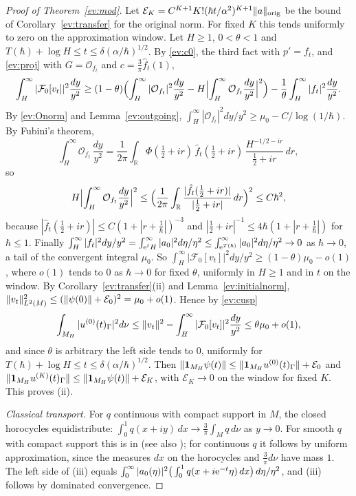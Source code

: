 \begin{proof}[Proof of Theorem~\ref{ev:mod}]
Let $\mathcal E_K=C^{K+1}K!(\hbar t/\alpha^2)^{K+1}\lVert a\rVert_{\mathrm{orig}}$ be the bound of Corollary~\ref{ev:transfer} for the original norm. For fixed $K$ this tends uniformly to zero on the approximation window. Let $H\ge1$, $0<\theta<1$ and $T(\hbar)+\log H\le t\le\delta(\alpha/\hbar)^{1/2}$. By \eqref{ev:c0}, the third fact with $p'=f_t$, and \eqref{ev:proj} with $G=\mathcal O_{f_t}$ and
$c=\tfrac3\pi\hat f_t(1)$,
\[
  \int_H^\infty|\mathcal F_0[v_t]|^2\frac{dy}{y^2}\ge(1-\theta)\Bigl(\int_H^\infty|\mathcal O_{f_t}|^2\frac{dy}{y^2}-H\Bigl|\int_H^\infty\mathcal O_{f_t}\frac{dy}{y^2}\Bigr|^2\Bigr)
  -\frac1\theta\int_H^\infty|f_t|^2\frac{dy}{y^2}.
\]
By \eqref{ev:Onorm} and Lemma~\ref{ev:outgoing}, $\int_H^\infty|\mathcal O_{f_t}|^2dy/y^2\ge\mu_0-C/\log(1/\hbar)$. By Fubini's theorem,
\[
  \int_H^\infty\mathcal O_{f_t}\,\frac{dy}{y^2}=\frac1{2\pi}\int_{\mathbb R}\Phi(\tfrac12+ir)\,\hat f_t(\tfrac12+ir)\,\frac{H^{-1/2-ir}}{\tfrac12+ir}\,dr,
\]
so
\[
  H\Bigl|\int_H^\infty\mathcal O_{f_t}\frac{dy}{y^2}\Bigr|^2\le\Bigl(\frac1{2\pi}\int_{\mathbb R}\frac{|\hat f_t(\tfrac12+ir)|}{|\tfrac12+ir|}\,dr\Bigr)^2\le C\hbar^2 ,
\]
because $|\hat f_t(\tfrac12+ir)|\le C(1+|r+\tfrac1\hbar|)^{-3}$ and $|\tfrac12+ir|^{-1}\le4\hbar(1+|r+\tfrac1\hbar|)$ for $\hbar\le1$. Finally
$\int_H^\infty|f_t|^2dy/y^2=\int_{\mathrm{e}^tH}^\infty|a_0|^2d\eta/\eta^2\le\int_{\mathrm{e}^{T(\hbar)}}^\infty|a_0|^2d\eta/\eta^2\to0$ as $\hbar\to0$, a tail of the convergent integral $\mu_0$.
So $\int_H^\infty|\mathcal F_0[v_t]|^2dy/y^2\ge(1-\theta)\mu_0-o(1)$, where $o(1)$ tends to $0$ as $\hbar\to0$ for fixed $\theta$, uniformly in $H\ge1$ and in $t$ on the
window. By Corollary~\ref{ev:transfer}(ii) and Lemma~\ref{ev:initialnorm}, $\lVert v_t\rVert^2_{L^2(M)}\le(\lVert \psi(0)\rVert+\mathcal E_0)^2=\mu_0+o(1)$. Hence by \eqref{ev:cusp}
\[
  \int_{M_H}|u^{(0)}(t)_\Gamma|^2d\nu\le\lVert v_t\rVert^2-\int_H^\infty|\mathcal F_0[v_t]|^2\frac{dy}{y^2}\le\theta\mu_0+o(1),
\]
and since $\theta$ is arbitrary the left side tends to $0$, uniformly for $T(\hbar)+\log H\le t\le\delta(\alpha/\hbar)^{1/2}$. Then
$\lVert \mathbf 1_{M_H}\psi(t)\rVert\le\lVert \mathbf 1_{M_H}u^{(0)}(t)_\Gamma\rVert+\mathcal E_0$ and
$\lVert \mathbf 1_{M_H}u^{(K)}(t)_\Gamma\rVert\le\lVert \mathbf 1_{M_H}\psi(t)\rVert+\mathcal E_K$, with $\mathcal E_K\to0$ on the window for fixed $K$. This proves (ii).

\emph{Classical transport.} For $q$ continuous with compact support in $M$, the closed horocycles equidistribute:
$\int_0^1q(x+iy)\,dx\to\tfrac3\pi\int_Mq\,d\nu$ as $y\to0$. For smooth $q$ with compact support this is in \cite[Section~1, pp.~279--280]{Zag81}
(see also \cite{Sar81}); for continuous $q$ it follows by uniform approximation, since the measures $dx$ on the horocycles and
$\tfrac3\pi d\nu$ have mass $1$. The left side of (iii) equals
$\int_0^\infty|a_0(\eta)|^2\big(\int_0^1q(x+i\mathrm{e}^{-t}\eta)\,dx\big)\,d\eta/\eta^2$, and (iii) follows by dominated convergence. \end{proof}
